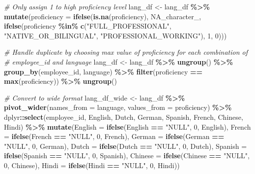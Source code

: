 \documentclass[11pt,]{article}
\newenvironment{Shaded}{\begin{snugshade}}{\end{snugshade}}
\newcommand{\AttributeTok}[1]{\textcolor[rgb]{0.13,0.29,0.53}{#1}}
\newcommand{\CommentTok}[1]{\textcolor[rgb]{0.56,0.35,0.01}{\textit{#1}}}
\newcommand{\ConstantTok}[1]{\textcolor[rgb]{0.56,0.35,0.01}{#1}}
\newcommand{\DecValTok}[1]{\textcolor[rgb]{0.00,0.00,0.81}{#1}}
\newcommand{\FunctionTok}[1]{\textcolor[rgb]{0.13,0.29,0.53}{\textbf{#1}}}
\newcommand{\NormalTok}[1]{#1}
\newcommand{\OtherTok}[1]{\textcolor[rgb]{0.56,0.35,0.01}{#1}}
\newcommand{\SpecialCharTok}[1]{\textcolor[rgb]{0.81,0.36,0.00}{\textbf{#1}}}
\newcommand{\StringTok}[1]{\textcolor[rgb]{0.31,0.60,0.02}{#1}}
\begin{document}
\begin{Shaded}
\begin{Highlighting}[]
\CommentTok{\# Only assign 1 to high proficiency level}
\NormalTok{lang\_df }\OtherTok{\textless{}{-}}\NormalTok{ lang\_df }\SpecialCharTok{\%\textgreater{}\%}
  \FunctionTok{mutate}\NormalTok{(}\AttributeTok{proficiency =} \FunctionTok{ifelse}\NormalTok{(}\FunctionTok{is.na}\NormalTok{(proficiency), }\ConstantTok{NA\_character\_}\NormalTok{, }
                              \FunctionTok{ifelse}\NormalTok{(proficiency }\SpecialCharTok{\%in\%} \FunctionTok{c}\NormalTok{(}\StringTok{"FULL\_PROFESSIONAL"}\NormalTok{, }
                                                        \StringTok{"NATIVE\_OR\_BILINGUAL"}\NormalTok{, }
                                                        \StringTok{"PROFESSIONAL\_WORKING"}\NormalTok{), }
                                     \DecValTok{1}\NormalTok{, }\DecValTok{0}\NormalTok{)))}

\CommentTok{\# Handle duplicate by choosing max value of proficiency for each combination of}
\CommentTok{\# employee\_id and language}
\NormalTok{lang\_df }\OtherTok{\textless{}{-}}\NormalTok{ lang\_df }\SpecialCharTok{\%\textgreater{}\%}
  \FunctionTok{ungroup}\NormalTok{() }\SpecialCharTok{\%\textgreater{}\%}
  \FunctionTok{group\_by}\NormalTok{(employee\_id, language) }\SpecialCharTok{\%\textgreater{}\%}
  \FunctionTok{filter}\NormalTok{(proficiency }\SpecialCharTok{==} \FunctionTok{max}\NormalTok{(proficiency)) }\SpecialCharTok{\%\textgreater{}\%}
  \FunctionTok{ungroup}\NormalTok{()}

\CommentTok{\# Convert to wide format}
\NormalTok{lang\_df\_wide }\OtherTok{\textless{}{-}}\NormalTok{ lang\_df }\SpecialCharTok{\%\textgreater{}\%}
  \FunctionTok{pivot\_wider}\NormalTok{(}\AttributeTok{names\_from =}\NormalTok{ language, }\AttributeTok{values\_from =}\NormalTok{ proficiency) }\SpecialCharTok{\%\textgreater{}\%} 
\NormalTok{  dplyr}\SpecialCharTok{::}\FunctionTok{select}\NormalTok{(employee\_id, English, Dutch, German, Spanish, French, Chinese, Hindi) }\SpecialCharTok{\%\textgreater{}\%} 
  \FunctionTok{mutate}\NormalTok{(}\AttributeTok{English =} \FunctionTok{ifelse}\NormalTok{(English }\SpecialCharTok{==} \StringTok{"NULL"}\NormalTok{, }\DecValTok{0}\NormalTok{, English),}
         \AttributeTok{French =} \FunctionTok{ifelse}\NormalTok{(French }\SpecialCharTok{==} \StringTok{"NULL"}\NormalTok{, }\DecValTok{0}\NormalTok{, French),}
         \AttributeTok{German =} \FunctionTok{ifelse}\NormalTok{(German }\SpecialCharTok{==} \StringTok{"NULL"}\NormalTok{, }\DecValTok{0}\NormalTok{, German),}
         \AttributeTok{Dutch =} \FunctionTok{ifelse}\NormalTok{(Dutch }\SpecialCharTok{==} \StringTok{"NULL"}\NormalTok{, }\DecValTok{0}\NormalTok{, Dutch),}
         \AttributeTok{Spanish =} \FunctionTok{ifelse}\NormalTok{(Spanish }\SpecialCharTok{==} \StringTok{"NULL"}\NormalTok{, }\DecValTok{0}\NormalTok{, Spanish),}
        \AttributeTok{Chinese =} \FunctionTok{ifelse}\NormalTok{(Chinese }\SpecialCharTok{==} \StringTok{"NULL"}\NormalTok{, }\DecValTok{0}\NormalTok{, Chinese),}
        \AttributeTok{Hindi =} \FunctionTok{ifelse}\NormalTok{(Hindi }\SpecialCharTok{==} \StringTok{"NULL"}\NormalTok{, }\DecValTok{0}\NormalTok{, Hindi))}


\end{Highlighting}
\end{Shaded}
\end{document}
